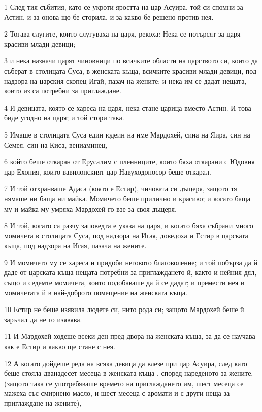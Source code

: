 \par 1 След тия събития, като се укроти яростта на цар Асуира, той си спомни за Астин, и за онова що бе сторила, и за какво бе решено против нея.
\par 2 Тогава слугите, които слугуваха на царя, рекоха: Нека се потърсят за царя красиви млади девици;
\par 3 и нека назначи царят чиновници по всичките области на царството си, които да съберат в столицата Суса, в женската къща, всичките красиви млади девици, под надзора на царския скопец Игай, пазач на жените; и нека им се дадат нещата, които из са потребни за приглаждане.
\par 4 И девицата, която се хареса на царя, нека стане царица вместо Астин. И това биде угодно на царя; и той стори така.
\par 5 Имаше в столицата Суса един юдеин на име Мардохей, сина на Яира, син на Семея, син на Киса, вениаминец,
\par 6 който беше откаран от Ерусалим с пленниците, които бяха откарани с Юдовия цар Ехония, които вавилонският цар Навуходоносор беше откарал.
\par 7 И той отхранваше Адаса (която е Естир), чичовата си дъщеря, защото тя нямаше ни баща ни майка. Момичето беше прилично и красиво; и когато баща му и майка му умряха Мардохей го взе за своя дъщеря.
\par 8 И той, когато са разчу заповедта е указа на царя, и когато бяха събрани много момичета в столицата Суса, под надзора на Игая, доведоха и Естир в царската къща, под надзора на Игая, пазача на жените.
\par 9 И момичето му се хареса и придоби неговото благоволение; и той побърза да й даде от царската къща нещата потребни за приглаждането й, както и нейния дял, също и седемте момичета, които подобаваше да й се дадат; и премести нея и момичетата й в най-доброто помещение на женската къща.
\par 10 Естир не беше изявила людете си, нито рода си; защото Мардохей беше й заръчал да не го изявява.
\par 11 И Мардохей ходеше всеки ден пред двора на женската къща, за да се научава как е Естир и какво ще стане с нея.
\par 12 А когато дойдеше реда на всяка девица да влезе при цар Асуира, след като беше стояла дванадесет месеца в женската къща , според нареденото за жените, (защото така се употребяваше времето на приглаждането им, шест месеца се мажеха със смирнено масло, и шест месеца с аромати и с други неща за приглаждане на жените),
